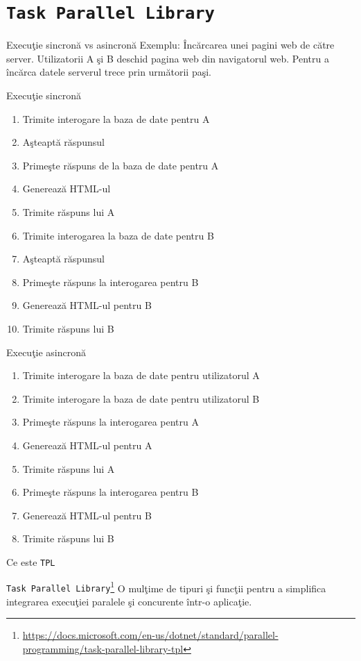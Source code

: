 \documentclass[presentation]{beamer}
\begin{document}
\section{\texttt{Task Parallel Library}}
\label{sec:org22792d6}
\begin{frame}[label={sec:org5de85cf}]{Execuţie sincronă vs asincronă}
Exemplu: Încărcarea unei pagini web de către server.
\vskip 0.1in
Utilizatorii A  şi B deschid pagina web din navigatorul web. Pentru a încărca datele serverul trece prin următorii paşi.
\end{frame}
\begin{frame}[label={sec:orgd9fd7d4}]{Execuţie sincronă}
\begin{enumerate}
\item Trimite interogare la baza de date pentru A
\item Aşteaptă răspunsul
\item Primeşte răspuns de la baza de date pentru A
\item Generează HTML-ul
\item Trimite răspuns lui A
\item Trimite interogarea la baza de date pentru B
\item Aşteaptă răspunsul
\item Primeşte răspuns la interogarea pentru B
\item Generează HTML-ul pentru B
\item Trimite răspuns lui B
\end{enumerate}
\end{frame}
\begin{frame}[label={sec:orga69a0ec}]{Execuţie asincronă}
\begin{enumerate}
\item Trimite interogare la baza de date pentru utilizatorul A
\item Trimite interogare la baza de date pentru utilizatorul B
\item Primeşte răspuns la interogarea pentru A
\item Generează HTML-ul pentru A
\item Trimite răspuns lui A
\item Primeşte răspuns la interogarea pentru B
\item Generează HTML-ul pentru B
\item Trimite răspuns lui B
\end{enumerate}
\end{frame}
\begin{frame}[label={sec:org3978cc1},fragile]{Ce este \texttt{TPL}}
 \begin{block}{\texttt{Task Parallel Library}\footnote{\url{https://docs.microsoft.com/en-us/dotnet/standard/parallel-programming/task-parallel-library-tpl}}}
\vskip 0.1in
O mulţime de tipuri şi funcţii pentru a simplifica integrarea execuţiei paralele şi concurente într-o aplicaţie.
\end{block}
\end{frame}
\end{document}
